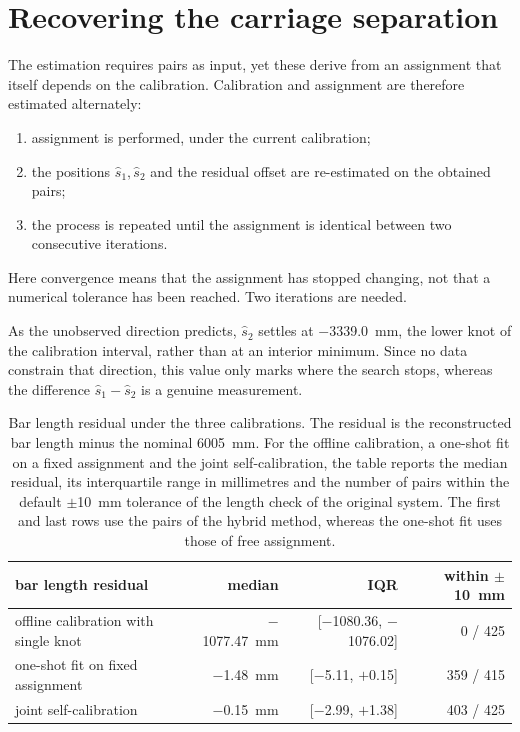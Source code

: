 \documentclass[a4paper, 12pt, twoside]{book}
\begin{document}
\section{Recovering the carriage separation}
\label{sec:identify-recovery}

The estimation requires pairs as input, yet these derive from an assignment that itself depends on the calibration. Calibration and assignment are therefore estimated alternately:

\begin{enumerate}
\item assignment is performed, under the current calibration;
\item the positions $\hat s_1, \hat s_2$ and the residual offset are re-estimated on the obtained pairs;
\item the process is repeated until the assignment is identical between two consecutive iterations.
\end{enumerate}

Here convergence means that the assignment has stopped changing, not that a numerical tolerance has been reached. Two iterations are needed.

As the unobserved direction predicts, $\hat s_2$ settles at $-$3339.0~mm, the lower knot of the calibration interval, rather than at an interior minimum. Since no data constrain that direction, this value only marks where the search stops, whereas the difference $\hat s_1 - \hat s_2$ is a genuine measurement.

\begin{table}[htbp]
\centering
\caption[Bar length residual under the three calibrations]{Bar length residual under the three calibrations. The residual is the reconstructed bar length minus the nominal 6005~mm. For the offline calibration, a one-shot fit on a fixed assignment and the joint self-calibration, the table reports the median residual, its interquartile range in millimetres and the number of pairs within the default $\pm$10~mm tolerance of the length check of the original system. The first and last rows use the pairs of the hybrid method, whereas the one-shot fit uses those of free assignment.}
\label{tab:length-residual}
\begin{tabular}{@{}lrrr@{}}
\toprule
bar length residual & median & IQR & within $\pm$10~mm \\
\midrule
offline calibration with single knot & $-$1077.47~mm & [$-$1080.36, $-$1076.02] & 0 / 425 \\
one-shot fit on fixed assignment & $-$1.48~mm & [$-$5.11, $+$0.15] & 359 / 415 \\
joint self-calibration & $-$0.15~mm & [$-$2.99, $+$1.38] & 403 / 425 \\
\bottomrule
\end{tabular}
\end{table}
\end{document}
